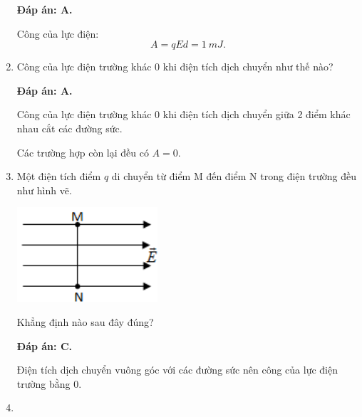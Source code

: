 \begin{enumerate}[label=\bfseries Câu \arabic*:]
{	}
	\loigiai
	{	\textbf{Đáp án: A.}
		
		Công của lực điện:
		$$A=qEd=\SI{1}{mJ}.$$
	}
	\item {}
	
	\cauhoi
	{Công của lực điện trường khác 0 khi điện tích dịch chuyển như thế nào?
		
	}
	\loigiai
	{	\textbf{Đáp án: A.}
		
		Công của lực điện trường khác 0 khi điện tích dịch chuyển giữa 2 điểm khác nhau cắt các đường sức.
		
		Các trường hợp còn lại đều có $A=0$.
	}
	\item {}
	
	\cauhoi
	{Một điện tích điểm $q$ di chuyển từ điểm M đến điểm N trong điện trường đều như hình vẽ.
		\begin{center}
			\includegraphics{../figs/VN11-2021-PH-TP005-1}
		\end{center}
	Khẳng định nào sau đây đúng?
		
	}
	\loigiai
	{	\textbf{Đáp án: C.}
		
		Điện tích dịch chuyển vuông góc với các đường sức nên công của lực điện trường bằng 0.
	}
	\item {}
	

\end{enumerate}
